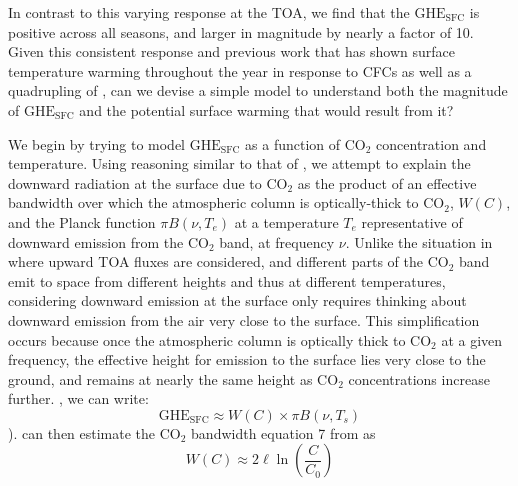 \documentclass[draft]{agujournal2019}
\begin{document}
In contrast to this varying response at the TOA, we find that the ${\text{GHE}_\text{{SFC}}}$ is positive across all seasons, and larger in magnitude by nearly a factor of 10. Given this consistent response and previous work that has shown surface temperature warming throughout the year in response to CFCs \cite{flanner_climate_2018} as well as a quadrupling of  \cite{smith_no_2018}, can we devise a simple model to understand both the magnitude of ${\text{GHE}_\text{{SFC}}}$ and the potential surface warming that would result from it? 

We begin by trying to model ${\text{GHE}_\text{{SFC}}}$ as a function of CO$_2$ concentration and temperature. Using reasoning similar to that of , we attempt to explain the downward radiation at the surface due to CO$_2$ as the product of an effective bandwidth over which the atmospheric column is optically-thick to CO$_2$, $W(C)$, and the Planck function $\pi B(\nu,T_e)$ at a temperature $T_e$ representative of downward emission from the CO$_2$ band, at frequency $\nu$. Unlike the situation in  where upward TOA fluxes are considered, and different parts of the CO$_2$ band emit to space from different heights and thus at different temperatures, considering downward emission at the surface only requires thinking about downward emission from the air very close to the surface. This simplification occurs because once the atmospheric column is optically thick to CO$_2$ at a given frequency, the effective height for emission to the surface lies very close to the ground, and remains at nearly the same height as CO$_2$ concentrations increase further. , we can write:
\begin{equation}
    {\text{GHE}_\text{{SFC}}} \approx W(C)\times \pi B(\nu,T_s) \label{eq:ghe_sfc}
\end{equation}
   ). 
 can then estimate the CO$_2$ bandwidth  equation 7 from  as
\begin{equation}\label{eq:bandwidth}
    W(C) \approx 2\ell \ln \left(\frac{C}{C_0}\right)
\end{equation}
\end{document}

